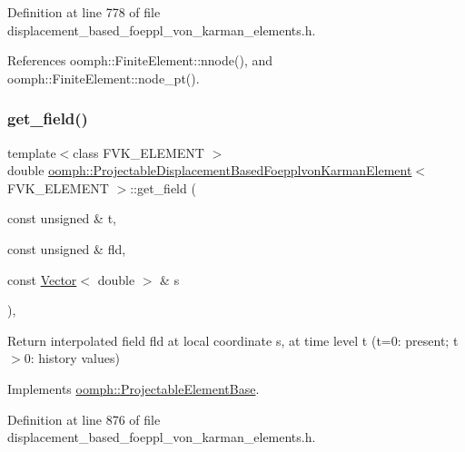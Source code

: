 Definition at line 778 of file displacement\+\_\+based\+\_\+foeppl\+\_\+von\+\_\+karman\+\_\+elements.\+h.



References oomph\+::\+Finite\+Element\+::nnode(), and oomph\+::\+Finite\+Element\+::node\+\_\+pt().

\mbox{\label{classoomph_1_1ProjectableDisplacementBasedFoepplvonKarmanElement_a942127e4616e7affc908c28c2561ce5a}} 
\subsubsection{\texorpdfstring{get\+\_\+field()}{get\_field()}}
{\footnotesize\ttfamily template$<$class F\+V\+K\+\_\+\+E\+L\+E\+M\+E\+NT $>$ \\
double \hyperlink{classoomph_1_1ProjectableDisplacementBasedFoepplvonKarmanElement}{oomph\+::\+Projectable\+Displacement\+Based\+Foepplvon\+Karman\+Element}$<$ F\+V\+K\+\_\+\+E\+L\+E\+M\+E\+NT $>$\+::get\+\_\+field (\begin{DoxyParamCaption}\item[{const unsigned \&}]{t,  }\item[{const unsigned \&}]{fld,  }\item[{const \hyperlink{classoomph_1_1Vector}{Vector}$<$ double $>$ \&}]{s }\end{DoxyParamCaption})\hspace{0.3cm}{\ttfamily [inline]}, {\ttfamily [virtual]}}



Return interpolated field fld at local coordinate s, at time level t (t=0\+: present; t$>$0\+: history values) 



Implements \hyperlink{classoomph_1_1ProjectableElementBase_ae4da5b565b6d333be2f5920f7be763cd}{oomph\+::\+Projectable\+Element\+Base}.



Definition at line 876 of file displacement\+\_\+based\+\_\+foeppl\+\_\+von\+\_\+karman\+\_\+elements.\+h.



